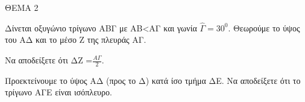 
ΘΕΜΑ 2

Δίνεται οξυγώνιο τρίγωνο ΑΒΓ με ΑΒ\textless ΑΓ και γωνία $\widehat{\Gamma} = 30^{0}$. Θεωρούμε το ύψος του ΑΔ και το μέσο Ζ της πλευράς ΑΓ.

\begin{alist}
\item Να αποδείξετε ότι ΔΖ =$\frac{Α\Gamma}{2}$. 

\item Προεκτείνουμε το ύψος ΑΔ (προς το Δ) κατά ίσο τμήμα ΔΕ. Να αποδείξετε ότι το τρίγωνο ΑΓΕ είναι ισόπλευρο. 
\end{alist}

